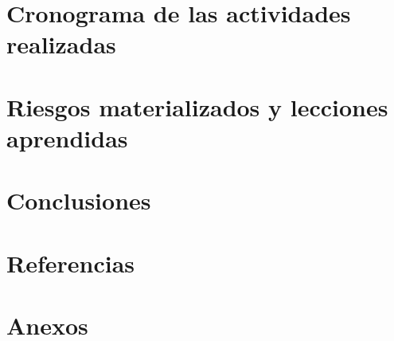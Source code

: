 \documentclass[11pt]{article}
\begin{document}


\section{Cronograma de las actividades realizadas}



\section{Riesgos materializados y lecciones aprendidas}



\section{Conclusiones}



\section{Referencias}



\section{Anexos}


\end{document}
